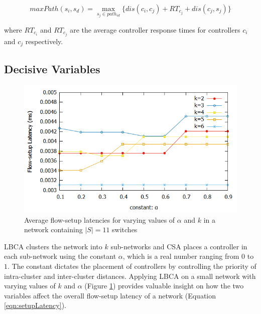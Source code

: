 \documentclass[final,5p,times]{cas-dc}
\begin{document}
	\begin{equation}
	maxPath(s_i,s_d) = \max_{s_j\in path_{id}}\{dis(c_i,c_j)+RT_{c_j}+dis(c_j,s_j)\}
	\end{equation}
	
	where $RT_{c_i}$  and $RT_{c_j}$ are the average controller response times for controllers $c_i$ and $c_j$ respectively.
	
	\subsection{Decisive Variables} \label{optimumK}
	
	\begin{figure}
		\centering
		\includegraphics[width=0.95\linewidth]{Images/Abilene_Analysis.png}
		\caption{Average flow-setup latencies for varying values of $\alpha$ and $k$ in a network containing $|S|=11$ switches} \label{fig:abileneA}
	\end{figure}

	LBCA clusters the network into $k$ sub-networks and CSA places a controller in each sub-network using the constant $\alpha$, which is a real number ranging from $0$ to $1$. The constant dictates the placement of controllers by controlling the priority of intra-cluster and inter-cluster distances. Applying LBCA on a small network with varying values of $k$ and $\alpha$ (Figure \ref{fig:abileneA}) provides valuable insight on how the two variables affect the overall flow-setup latency of a network (Equation \ref{eqn:setupLatency}).
	
\end{document}
